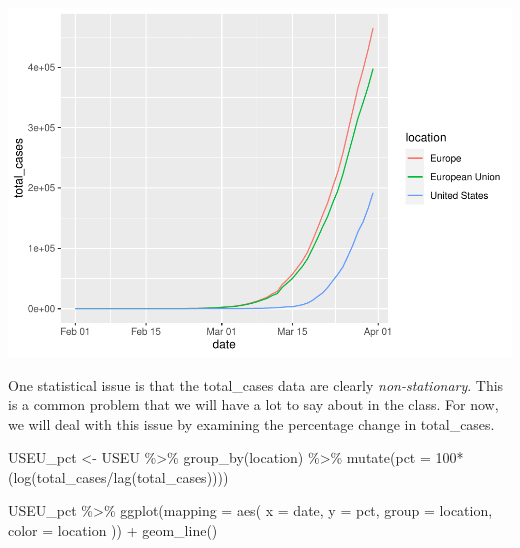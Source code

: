 \documentclass[
]{article}
\newenvironment{Shaded}{}{}
\newcommand{\AttributeTok}[1]{#1}
\newcommand{\DecValTok}[1]{#1}
\newcommand{\FunctionTok}[1]{#1}
\newcommand{\NormalTok}[1]{#1}
\newcommand{\OtherTok}[1]{\textcolor[rgb]{1.00,0.25,0.00}{#1}}
\newcommand{\SpecialCharTok}[1]{\textcolor[rgb]{0.00,0.50,0.50}{#1}}
\begin{document}
\includegraphics{covid_files/figure-latex/unnamed-chunk-4-1.pdf}

One statistical issue is that the total\_cases data are clearly
\emph{non-stationary}. This is a common problem that we will have a lot
to say about in the class. For now, we will deal with this issue by
examining the percentage change in total\_cases.

\begin{Shaded}
\begin{Highlighting}[]
\NormalTok{USEU\_pct }\OtherTok{\textless{}{-}}\NormalTok{ USEU }\SpecialCharTok{\%\textgreater{}\%}
  \FunctionTok{group\_by}\NormalTok{(location) }\SpecialCharTok{\%\textgreater{}\%} 
  \FunctionTok{mutate}\NormalTok{(}\AttributeTok{pct =} \DecValTok{100}\SpecialCharTok{*}\NormalTok{(}\FunctionTok{log}\NormalTok{(total\_cases}\SpecialCharTok{/}\FunctionTok{lag}\NormalTok{(total\_cases))))}
\end{Highlighting}
\end{Shaded}

\begin{Shaded}
\begin{Highlighting}[]
\NormalTok{USEU\_pct }\SpecialCharTok{\%\textgreater{}\%} 
  \FunctionTok{ggplot}\NormalTok{(}\AttributeTok{mapping =} \FunctionTok{aes}\NormalTok{(}
    \AttributeTok{x =}\NormalTok{ date,}
    \AttributeTok{y =}\NormalTok{ pct,}
    \AttributeTok{group =}\NormalTok{ location,}
    \AttributeTok{color =}\NormalTok{ location}
\NormalTok{  )) }\SpecialCharTok{+} \FunctionTok{geom\_line}\NormalTok{()}
\end{Highlighting}
\end{Shaded}
\end{document}
